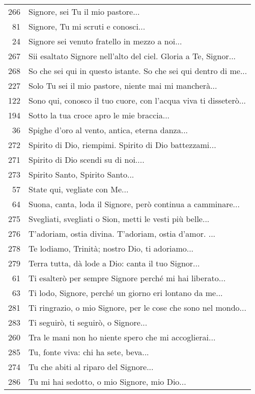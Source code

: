 {\begin{flushleft}
\begin{longtable}{r m{11cm}}
    266 & Signore, sei Tu il mio pastore...\\
    81 & Signore, Tu mi scruti e conosci...\\
    24 & Signore sei venuto fratello in mezzo a noi...\\
    267 & Sii esaltato Signore nell'alto del ciel. Gloria a Te, Signor...\\
    268 & So che sei qui in questo istante. So che sei qui dentro di me...\\
    227 & Solo Tu sei il mio pastore, niente mai mi mancherà...\\
    122 & Sono qui, conosco il tuo cuore, con l'acqua viva ti disseterò...\\
    194 & Sotto la tua croce apro le mie braccia...\\
    36 & Spighe d'oro al vento, antica, eterna danza...\\
    272 & Spirito di Dio, riempimi. Spirito di Dio battezzami...\\
    271 & Spirito di Dio scendi su di noi....\\
    273 & Spirito Santo, Spirito Santo...\\
    57 & State qui, vegliate con Me...\\
    64 & Suona, canta, loda il Signore, però continua a camminare...\\
    275 & Svegliati, svegliati o Sion, metti le vesti più belle...\\
    276 & T'adoriam, ostia divina. T'adoriam, ostia d'amor. ...\\
    278 & Te lodiamo, Trinità; nostro Dio, ti adoriamo...\\
    279 & Terra tutta, dà lode a Dio: canta il tuo Signor...\\
    61 & Ti esalterò per sempre Signore perché mi hai liberato...\\
    63 & Ti lodo, Signore, perché un giorno eri lontano da me...\\
    281 & Ti ringrazio, o mio Signore, per le cose che sono nel mondo...\\
    283 & Ti seguirò, ti seguirò, o Signore...\\
    260 & Tra le mani non ho niente spero che mi accoglierai...\\
    285 & Tu, fonte viva: chi ha sete, beva...\\
    274 & Tu che abiti al riparo del Signore...\\
    286 & Tu mi hai sedotto, o mio Signore, mio Dio...\\

\end{longtable}
\end{flushleft}}
